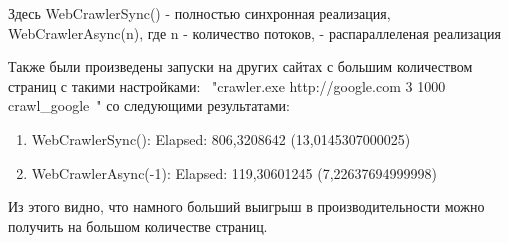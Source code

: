 \documentclass{article}
\begin{document}
    Здесь WebCrawlerSync() - полностью синхронная реализация, WebCrawlerAsync(n), где n - количество потоков, - распараллеленая реализация

    Также были произведены запуски на других сайтах с большим количеством страниц с такими настройками: \ "crawler.exe http://google.com 3 1000 crawl\_google\ " со следующими результатами:

    \begin{enumerate}
        \item WebCrawlerSync():    Elapsed: 806,3208642 (13,0145307000025)
        \item WebCrawlerAsync(-1): Elapsed: 119,30601245 (7,22637694999998)
    \end{enumerate}

    Из этого видно, что намного больший выигрыш в производительности можно получить на большом количестве страниц.
\end{document}
